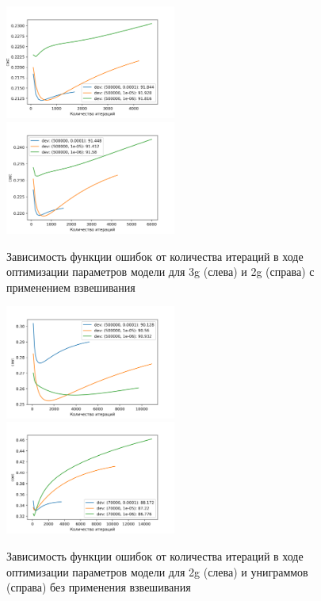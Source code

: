 \begin{figure}
\includegraphics[width=0.5\textwidth, height=0.4\textwidth]{3g_weight_500000.png}
\includegraphics[width=0.5\textwidth, height=0.4\textwidth]{2g_weight_500000.png}\\
\caption{Зависимость функции ошибок от количества итераций в ходе оптимизации параметров модели для 3g (слева) и 2g (справа) с применением взвешивания}
\label{3+2grams:weighted}
\end{figure}

\begin{figure}
\includegraphics[width=0.5\textwidth, height=0.4\textwidth]{2g_def_500000.png}
\includegraphics[width=0.5\textwidth, height=0.4\textwidth]{1g_def_70000.png}\\
\caption{Зависимость функции ошибок от количества итераций в ходе оптимизации параметров модели для 2g (слева) и униграммов (справа) без применения взвешивания}
\label{3+2grams:default}
\end{figure}
